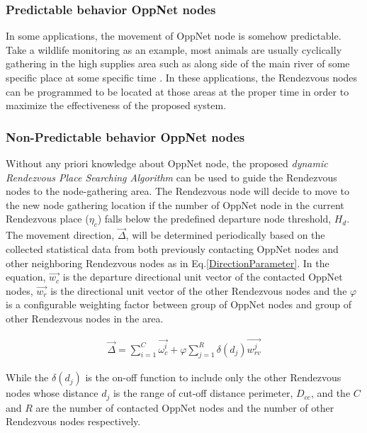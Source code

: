 \documentclass[conference]{IEEEtran}
\begin{document}
\subsubsection{Predictable behavior OppNet nodes}

In some applications, the movement of OppNet node is somehow predictable.
Take a wildlife monitoring as an example, most animals are usually cyclically gathering in the high supplies area such as along side of the main river of some specific place at some specific time \cite{Yu2007}.
In these applications, the Rendezvous nodes can be programmed to be located at those areas at the proper time in order to maximize the effectiveness of the proposed system.

\subsubsection{Non-Predictable behavior OppNet nodes}

Without any priori knowledge about OppNet node, the proposed \emph{dynamic Rendezvous Place Searching Algorithm} can be used to guide the Rendezvous nodes to the node-gathering area.
The Rendezvous node will decide to move to the new node gathering location if the number of OppNet node in the current Rendezvous place ($\eta_{c}$) falls below the predefined departure node threshold, $H_{d}$.
The movement direction, $\vec{\Delta}$, will be determined periodically based on the collected statistical data from both previously contacting OppNet nodes and other neighboring Rendezvous nodes as in Eq.\ref{DirectionParameter}.
In the equation, $\vec{w_c}$ is the departure directional unit vector of the contacted OppNet nodes, $\vec{w_r}$ is the directional unit vector of the other Rendezvous nodes and the $\varphi$ is a configurable weighting factor between group of OppNet nodes and group of other Rendezvous nodes in the area.

\begin{eqnarray}
\label{DirectionParameter}
\vec{\Delta} =\sum _{ i=1 }^{ C }{ \vec { { \omega }_{ c }^{ i } }  } + \varphi \sum _{ j=1 }^{ R }{ \delta\left( d_{j} \right)
	\vec { {w }_{ rv }^{ j } }  }
\end{eqnarray}

While the $\delta\left( d_{j} \right)$ is the on-off function to include only the other Rendezvous nodes whose distance $d_j$ is the range of cut-off distance perimeter, $D_{cc}$, and the  $C$ and $R$ are the number of contacted OppNet nodes and the number of other Rendezvous nodes respectively.
\end{document}
